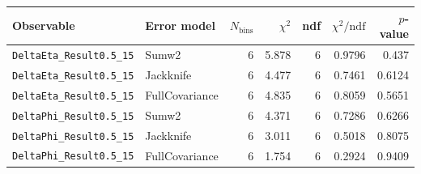 \begin{tabular}{|l|l|r|r|r|r|r|}
\hline
Observable & Error model & $N_{\mathrm{bins}}$ & $\chi^2$ & ndf & $\chi^2/\mathrm{ndf}$ & $p$-value \\
\hline
\texttt{DeltaEta\_Result0.5\_15} & Sumw2 & 6 & 5.878 & 6 & 0.9796 & 0.437 \\
\texttt{DeltaEta\_Result0.5\_15} & Jackknife & 6 & 4.477 & 6 & 0.7461 & 0.6124 \\
\texttt{DeltaEta\_Result0.5\_15} & FullCovariance & 6 & 4.835 & 6 & 0.8059 & 0.5651 \\
\texttt{DeltaPhi\_Result0.5\_15} & Sumw2 & 6 & 4.371 & 6 & 0.7286 & 0.6266 \\
\texttt{DeltaPhi\_Result0.5\_15} & Jackknife & 6 & 3.011 & 6 & 0.5018 & 0.8075 \\
\texttt{DeltaPhi\_Result0.5\_15} & FullCovariance & 6 & 1.754 & 6 & 0.2924 & 0.9409 \\
\hline
\end{tabular}
